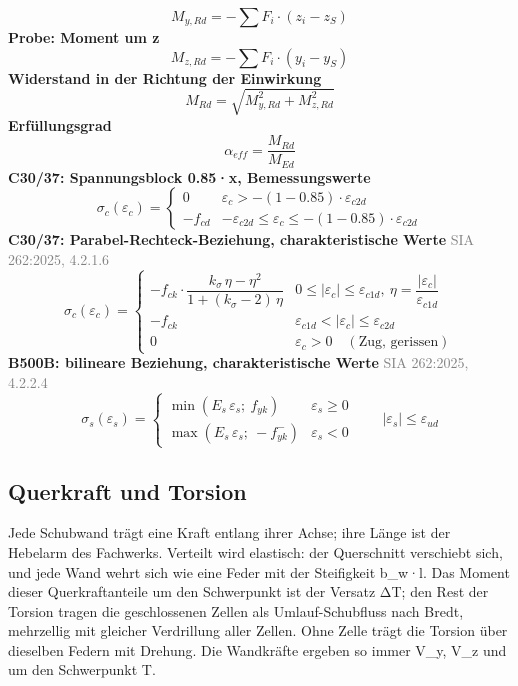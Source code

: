 \documentclass[11pt,a4paper]{article}
\newcommand{\normref}[1]{{\small\textcolor{gray}{#1}}}
\begin{document}
\begin{equation*}
M_{y,Rd} = -\sum F_i \cdot (z_i - z_S)
\end{equation*}
\noindent\textbf{Probe: Moment um z}
\begin{equation*}
M_{z,Rd} = -\sum F_i \cdot (y_i - y_S)
\end{equation*}
\noindent\textbf{Widerstand in der Richtung der Einwirkung}
\begin{equation*}
M_{Rd} = \sqrt{M_{y,Rd}^{2} + M_{z,Rd}^{2}}
\end{equation*}
\noindent\textbf{Erfüllungsgrad}
\begin{equation*}
\alpha_{eff} = \frac{M_{Rd}}{M_{Ed}}
\end{equation*}
\noindent\textbf{C30/37: Spannungsblock 0.85·x, Bemessungswerte}
\begin{equation*}
\sigma_c(\varepsilon_c) = \begin{cases} 0 & \varepsilon_c > -(1 - 0.85) \cdot \varepsilon_{c2d} \\[1ex] -f_{cd} & -\varepsilon_{c2d} \le \varepsilon_c \le -(1 - 0.85) \cdot \varepsilon_{c2d} \end{cases}
\end{equation*}
\noindent\textbf{C30/37: Parabel-Rechteck-Beziehung, charakteristische Werte} \hfill \normref{SIA 262:2025, 4.2.1.6}
\begin{equation*}
\sigma_c(\varepsilon_c) = \begin{cases} -f_{ck} \cdot \dfrac{k_\sigma\,\eta - \eta^2}{1 + (k_\sigma - 2)\,\eta} & 0 \le |\varepsilon_c| \le \varepsilon_{c1d},\ \eta = \dfrac{|\varepsilon_c|}{\varepsilon_{c1d}} \\[2ex] -f_{ck} & \varepsilon_{c1d} < |\varepsilon_c| \le \varepsilon_{c2d} \\[1ex] 0 & \varepsilon_c > 0 \quad (\text{Zug, gerissen}) \end{cases}
\end{equation*}
\noindent\textbf{B500B: bilineare Beziehung, charakteristische Werte} \hfill \normref{SIA 262:2025, 4.2.2.4}
\begin{equation*}
\sigma_s(\varepsilon_s) = \begin{cases} \min(E_s\,\varepsilon_s;\ f_{yk}) & \varepsilon_s \ge 0 \\[1ex] \max(E_s\,\varepsilon_s;\ -f_{yk}^{-}) & \varepsilon_s < 0 \end{cases} \qquad |\varepsilon_s| \le \varepsilon_{ud}
\end{equation*}
\subsection{Querkraft und Torsion}
Jede Schubwand trägt eine Kraft entlang ihrer Achse; ihre Länge ist der Hebelarm des Fachwerks. Verteilt wird elastisch: der Querschnitt verschiebt sich, und jede Wand wehrt sich wie eine Feder mit der Steifigkeit b\_w·l. Das Moment dieser Querkraftanteile um den Schwerpunkt ist der Versatz ΔT; den Rest der Torsion tragen die geschlossenen Zellen als Umlauf-Schubfluss nach Bredt, mehrzellig mit gleicher Verdrillung aller Zellen. Ohne Zelle trägt die Torsion über dieselben Federn mit Drehung. Die Wandkräfte ergeben so immer V\_y, V\_z und um den Schwerpunkt T.
\end{document}
